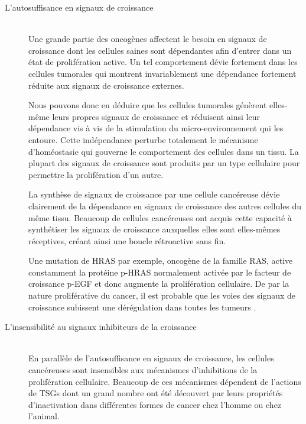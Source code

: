       \begin{description}
        \item [L'autosuffisance en signaux de croissance]               \hfill \\
          Une grande partie des oncogènes affectent le besoin en signaux de croissance dont les cellules saines sont dépendantes afin d'entrer dans un état de prolifération active.
          Un tel comportement dévie fortement dans les cellules tumorales qui montrent invariablement une dépendance fortement réduite aux signaux de croissance externes.

          Nous pouvons donc en déduire que les cellules tumorales génèrent elles-même leurs propres signaux de croissance et réduisent ainsi leur dépendance vis à vis de la stimulation du micro-environnement qui les entoure.
          Cette indépendance perturbe totalement le mécanisme d'homéostasie qui gouverne le comportement des cellules dans un tissu.
          La plupart des signaux de croissance sont produits par un type cellulaire pour permettre la prolifération d'un autre.

          La synthèse de signaux de croissance par une cellule cancéreuse dévie clairement de la dépendance en signaux de croissance des autres cellules du même tissu.
          Beaucoup de cellules cancéreuses ont acquis cette capacité à synthétiser les signaux de croissance auxquelles elles sont elles-mêmes réceptives, créant ainsi une boucle rétroactive sans fin.

          Une mutation de \acs{HRAS} par exemple, oncogène de la famille \acs{RAS}, active constamment la protéine \acs{p-HRAS} normalement activée par le facteur de croissance \acs{p-EGF} et donc augmente la prolifération cellulaire.
          De par la nature proliférative du cancer, il est probable que les voies des signaux de croissance subissent une dérégulation dans toutes les tumeurs \citep{Hanahan2000}.
 
        \item [L'insensibilité au signaux inhibiteurs de la croissance] \hfill \\
          En parallèle de l'autosuffisance en signaux de croissance, les cellules cancéreuses sont insensibles aux mécanismes d'inhibitions de la prolifération cellulaire.
          Beaucoup de ces mécanismes dépendent de l'actions de \acp{TSG} dont un grand nombre ont été découvert par leurs propriétés d'inactivation dans différentes formes de cancer chez l'homme ou chez l'animal.


\end{description}
